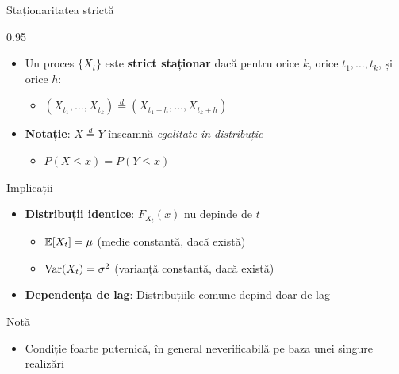 \documentclass[9pt, aspectratio=169, t]{beamer}
\begin{document}
\begin{frame}{Staționaritatea strictă}
    \begin{cminipage}{0.95\textwidth}
        \vspace{-0.25cm}
        \begin{defn}
            \begin{itemize}\setlength{\itemsep}{0pt}
                \item Un proces $\{X_t\}$ este \textbf{strict staționar} dacă pentru orice $k$, orice $t_1, \ldots, t_k$, și orice $h$:
                \begin{itemize}
                    \item $(X_{t_1}, \ldots, X_{t_k}) \stackrel{d}{=} (X_{t_1+h}, \ldots, X_{t_k+h})$
                \end{itemize}
                \item \textbf{Notație}: $X \stackrel{d}{=} Y$ înseamnă \textit{egalitate în distribuție}
                \begin{itemize}
                    \item $P(X \leq x) = P(Y \leq x)$
                \end{itemize}
            \end{itemize}
        \end{defn}
        \vspace{-0.1cm}
        \begin{block}{Implicații}
            \begin{itemize}\setlength{\itemsep}{0pt}
                \item \textbf{Distribuții identice}: $F_{X_t}(x)$ nu depinde de $t$
                \begin{itemize}
                    \item $\mathbb{E}[X_t] = \mu$ (medie constantă, dacă există)
                    \item $\text{Var}(X_t) = \sigma^2$ (varianță constantă, dacă există)
                \end{itemize}
                \item \textbf{Dependența de lag}: Distribuțiile comune depind doar de lag
            \end{itemize}
        \end{block}

        \vspace{-0.2cm}

        \begin{alertblock}{Notă}
            \begin{itemize}\setlength{\itemsep}{0pt}
                \item Condiție foarte puternică, în general neverificabilă pe baza unei singure realizări
            \end{itemize}
        \end{alertblock}
    \end{cminipage}
\end{frame}
\end{document}
